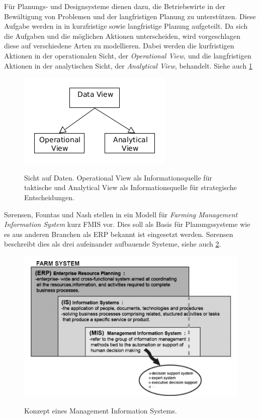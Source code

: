 Für Planungs- und Designsysteme dienen dazu, die Betriebswirte in der Bewältigung von Problemen und der langfristigen Planung zu unterstützen. Diese Aufgabe werden in \cite{jour:Schulze2007} in kurzfristige sowie langfristige Planung aufgeteilt. Da sich die Aufgaben und die möglichen Aktionen unterscheiden, wird vorgeschlagen diese auf verschiedene Arten zu modellieren. Dabei werden die kurfristigen Aktionen in der operationalen Sicht, der \textit{Operational View}, und die langfristigen Aktionen in der analytischen Sicht, der \textit{Analytical View}, behandelt. Siehe auch \ref{fig:dataviews}

\begin{figure}[h]
 \includegraphics[natwidth=\textwidth]{figures/datamodelling/dataviews.png}
 \centering
 \label{fig:dataviews}
 \caption{Sicht auf Daten. Operational View als Informationsquelle für taktische und Analytical View als Informationsquelle für strategische Entscheidungen.}
\end{figure}

S\o rensen, Fountas und Nash stellen in \cite{jour:Sorensen2010} ein Modell für \textit{Farming Management Information System} kurz FMIS vor. Dies soll als Basis für Planungssysteme wie es aus anderen Branchen als ERP bekannt ist eingesetzt werden. S\o rensen beschreibt dies als drei aufeinander aufbauende Systeme, siehe auch \ref{fig:fmishierarchy}.

\begin{figure}[h]
 \includegraphics[scale=0.5,natwidth=\textwidth]{figures/datamodelling/sorensen_fmis_2010.png}
 \centering
 \label{fig:fmishierarchy}
 \caption{Konzept eines Management Information Systems.\cite{jour:Sorensen2010}}
\end{figure}

